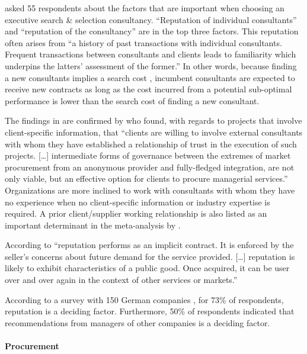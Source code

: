 \documentclass[12pt]{article}
\begin{document}
\citet[243-244]{clark1993} asked 55 respondents about the factors that
are important when choosing an executive search \& selection
consultancy. ``Reputation of individual consultants'' and ``reputation
of the consultancy'' are in the top three factors. This reputation often
arises from ``a history of past transactions with individual
consultants. Frequent transactions between consultants and clients leads
to familiarity which underpins the latters' assessment of the former.''
In other words, because finding a new consultants implies a search cost
\citep[ 1072]{wilson2012}, incumbent consultants are expected to receive
new contracts as long as the cost incurred from a potential sub-optimal
performance is lower than the search cost of finding a new consultant.

The findings in \citet{clark1993} are confirmed by
\citet[285]{richter2009} who found, with regards to projects that
involve client-specific information, that ``clients are willing to
involve external consultants with whom they have established a
relationship of trust in the execution of such projects. {[}\ldots{]}
intermediate forms of governance between the extremes of market
procurement from an anonymous provider and fully-fledged integration,
are not only viable, but an effective option for clients to procure
managerial services.'' Organizations are more inclined to work with
consultants with whom they have no experience when no client-specific
information or industry expertise is required. A prior client/supplier
working relationship is also listed as an important determinant in the
meta-analysis by \citet[235]{lacity2011}.

According to \citet[516]{nayyar1990} ``reputation performs as an
implicit contract. It is enforced by the seller's concerns about future
demand for the service provided. {[}\ldots{]} reputation is likely to
exhibit characteristics of a public good. Once acquired, it can be user
over and over again in the context of other services or markets.''

According to a survey with 150 German companies \citep[ 91]{kieser2006},
for 73\% of respondents, reputation is a deciding factor. Furthermore,
50\% of respondents indicated that recommendations from managers of
other companies is a deciding factor.

\hypertarget{procurement}{%
\paragraph{Procurement}\label{procurement}}
\end{document}
